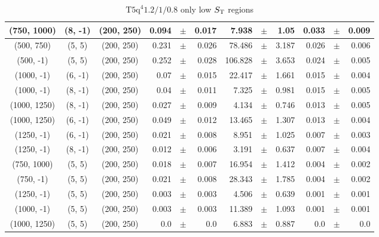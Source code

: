 \documentclass[12pt]{paper}
\newcommand{\TFiveqqqqHM}{\ensuremath{\textrm{T5q}^{4} 1.2/1/0.8}\xspace}
\newcommand{\ST}{\ensuremath{S_{\rm T}}\xspace}
\begin{document}
\begin{table}[ht]
\begin{center}
{\begin{tabular}{|c|c|c|rrr|rrr|rrr|}
(750, 1000)&(8, -1)&(200, 250)&0.094&$\pm$&0.017&7.938&$\pm$&1.05&0.033&$\pm$&0.009\\\hline
(500, 750)&(5, 5)&(200, 250)&0.231&$\pm$&0.026&78.486&$\pm$&3.187&0.026&$\pm$&0.006\\\hline
(500, -1)&(5, 5)&(200, 250)&0.252&$\pm$&0.028&106.828&$\pm$&3.653&0.024&$\pm$&0.005\\\hline
(1000, -1)&(6, -1)&(200, 250)&0.07&$\pm$&0.015&22.417&$\pm$&1.661&0.015&$\pm$&0.004\\\hline
(1000, -1)&(8, -1)&(200, 250)&0.04&$\pm$&0.011&7.325&$\pm$&0.981&0.015&$\pm$&0.005\\\hline
(1000, 1250)&(8, -1)&(200, 250)&0.027&$\pm$&0.009&4.134&$\pm$&0.746&0.013&$\pm$&0.005\\\hline
(1000, 1250)&(6, -1)&(200, 250)&0.049&$\pm$&0.012&13.465&$\pm$&1.307&0.013&$\pm$&0.004\\\hline
(1250, -1)&(6, -1)&(200, 250)&0.021&$\pm$&0.008&8.951&$\pm$&1.025&0.007&$\pm$&0.003\\\hline
(1250, -1)&(8, -1)&(200, 250)&0.012&$\pm$&0.006&3.191&$\pm$&0.637&0.007&$\pm$&0.004\\\hline
(750, 1000)&(5, 5)&(200, 250)&0.018&$\pm$&0.007&16.954&$\pm$&1.412&0.004&$\pm$&0.002\\\hline
(750, -1)&(5, 5)&(200, 250)&0.021&$\pm$&0.008&28.343&$\pm$&1.785&0.004&$\pm$&0.002\\\hline
(1250, -1)&(5, 5)&(200, 250)&0.003&$\pm$&0.003&4.506&$\pm$&0.639&0.001&$\pm$&0.001\\\hline
(1000, -1)&(5, 5)&(200, 250)&0.003&$\pm$&0.003&11.389&$\pm$&1.093&0.001&$\pm$&0.001\\\hline
(1000, 1250)&(5, 5)&(200, 250)&0.0&$\pm$&0.0&6.883&$\pm$&0.887&0.0&$\pm$&0.0\\\hline
\end{tabular}}\end{center}\caption{\TFiveqqqqHM only low \ST regions}\end{table}
\end{document}
